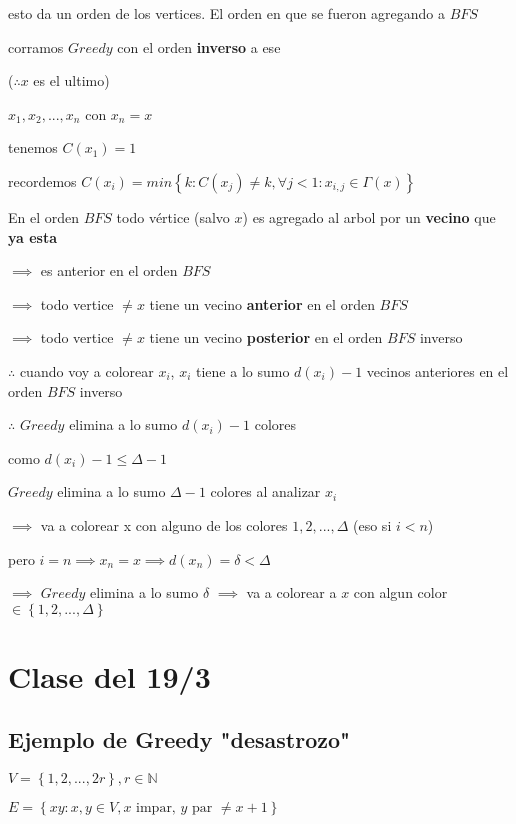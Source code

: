 \documentclass[12pt]{article}
\begin{document}
esto da un orden de los vertices. El orden en que se fueron agregando a $BFS$\bigskip

corramos $Greedy$ con el orden \textbf{inverso} a ese

($\therefore x$ es el ultimo)

$x_1, x_2, ... , x_n$ con $x_n = x$\bigskip

tenemos $C(x_1) = 1$

recordemos $C(x_i) = min\left\{k : C(x_j) \neq k,  \forall j < 1 : x_{i,j} \in \Gamma(x)\right\}$\bigskip

En el orden $BFS$ todo vértice (salvo $x$) es agregado al arbol por un \textbf{vecino} que \textbf{ya esta} 

$\implies$ es anterior en el orden $BFS$

$\implies$ todo vertice $\neq x$ tiene un vecino \textbf{anterior} en el orden $BFS$

$\implies$ todo vertice $\neq x$ tiene un vecino \textbf{posterior} en el orden $BFS$ inverso\bigskip

$\therefore$ cuando voy  a colorear $x_i$, $x_i$ tiene a lo sumo $d(x_i) - 1$ vecinos anteriores en el orden $BFS$ inverso

$\therefore$ $Greedy$ elimina a lo sumo $d(x_i) - 1$ colores\bigskip

como $d(x_i) - 1 \leq \Delta -1$

$Greedy$ elimina a lo sumo $\Delta - 1$ colores al analizar $x_i$

$\implies$ va a colorear x con alguno de los colores $1, 2, ..., \Delta$ (eso si $i < n$)\bigskip

pero $i=n \implies x_n = x \implies d(x_n) = \delta < \Delta$

$\implies$ $Greedy$ elimina a lo sumo $\delta$ $\implies$ va a colorear a $x$ con algun color $\in\left\{1, 2, ..., \Delta\right\}$

\newpage

\section*{Clase del 19/3}
\subsection*{Ejemplo de Greedy "desastrozo"}
\(V =  \left \{ 1, 2, ..., 2r\right \},  r  \in  \mathbb{N}\)

 \( E =  \left \{ xy : x, y  \in V, x  \text{ impar, } y  \text{ par }  \ne x + 1\right \}\)
\end{document}
